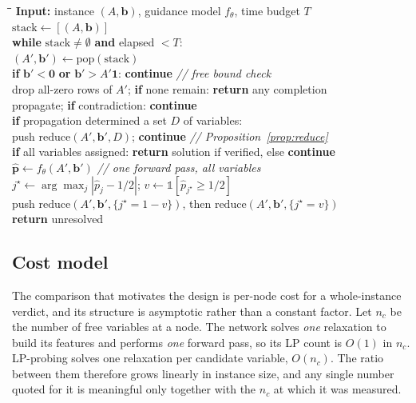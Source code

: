 \documentclass[11pt]{article}
\begin{document}
\begin{algorithm}[h]
\caption{Guided backtracking search for a BLS}
\label{alg:search}
\small
\begin{tabbing}
\hspace{6mm}\=\hspace{6mm}\=\hspace{6mm}\=\kill
\textbf{Input:} instance $(A,\mathbf{b})$, guidance model $f_\theta$, time budget $T$ \\
$\mathrm{stack} \gets [(A,\mathbf{b})]$ \\
\textbf{while} $\mathrm{stack}\ne\emptyset$ \textbf{and} elapsed $<T$: \\
\> $(A',\mathbf{b}') \gets \mathrm{pop}(\mathrm{stack})$ \\
\> \textbf{if} $\mathbf{b}' < \mathbf{0}$ \textbf{or} $\mathbf{b}' > A'\mathbf{1}$: \textbf{continue} \hfill \textit{// free bound check} \\
\> drop all-zero rows of $A'$; \textbf{if} none remain: \textbf{return} any completion \\
\> propagate; \textbf{if} contradiction: \textbf{continue} \\
\> \textbf{if} propagation determined a set $D$ of variables: \\
\> \> push $\mathrm{reduce}(A',\mathbf{b}',D)$; \textbf{continue} \hfill \textit{// Proposition~\ref{prop:reduce}} \\
\> \textbf{if} all variables assigned: \textbf{return} solution if verified, else \textbf{continue} \\
\> $\hat{\mathbf{p}} \gets f_\theta(A',\mathbf{b}')$ \hfill \textit{// one forward pass, all variables} \\
\> $j^\star \gets \arg\max_j |\hat{p}_j - 1/2|$; \quad $v \gets \mathbb{1}[\hat{p}_{j^\star}\ge 1/2]$ \\
\> push $\mathrm{reduce}(A',\mathbf{b}',\{j^\star{=}1{-}v\})$, then $\mathrm{reduce}(A',\mathbf{b}',\{j^\star{=}v\})$ \\
\textbf{return} unresolved
\end{tabbing}
\end{algorithm}

\subsection{Cost model}
\label{sec:method-cost}

The comparison that motivates the design is per-node cost for a whole-instance verdict, and its structure is asymptotic rather than a constant factor. Let $n_c$ be the number of free variables at a node. The network solves \emph{one} relaxation to build its features and performs \emph{one} forward pass, so its LP count is $O(1)$ in $n_c$. LP-probing solves one relaxation per candidate variable, $O(n_c)$. The ratio between them therefore grows linearly in instance size, and any single number quoted for it is meaningful only together with the $n_c$ at which it was measured.
\end{document}
